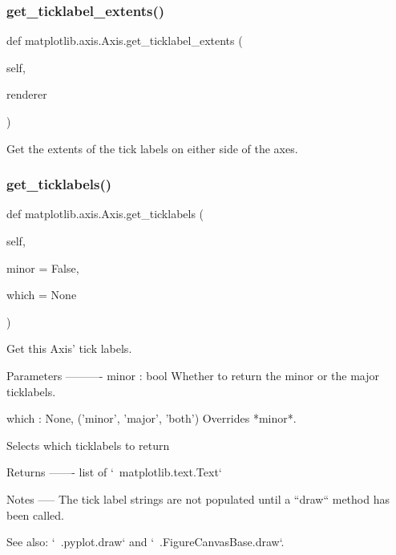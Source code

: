 \subsubsection{\texorpdfstring{get\+\_\+ticklabel\+\_\+extents()}{get\_ticklabel\_extents()}}
{\footnotesize\ttfamily def matplotlib.\+axis.\+Axis.\+get\+\_\+ticklabel\+\_\+extents (\begin{DoxyParamCaption}\item[{}]{self,  }\item[{}]{renderer }\end{DoxyParamCaption})}

\begin{DoxyVerb}Get the extents of the tick labels on either side
of the axes.
\end{DoxyVerb}
 \mbox{\label{classmatplotlib_1_1axis_1_1Axis_ae28c6fc8220dc16ef17eef94fd11fb4a}} 
\subsubsection{\texorpdfstring{get\+\_\+ticklabels()}{get\_ticklabels()}}
{\footnotesize\ttfamily def matplotlib.\+axis.\+Axis.\+get\+\_\+ticklabels (\begin{DoxyParamCaption}\item[{}]{self,  }\item[{}]{minor = {\ttfamily False},  }\item[{}]{which = {\ttfamily None} }\end{DoxyParamCaption})}

\begin{DoxyVerb}Get this Axis' tick labels.

Parameters
----------
minor : bool
   Whether to return the minor or the major ticklabels.

which : None, ('minor', 'major', 'both')
   Overrides *minor*.

   Selects which ticklabels to return

Returns
-------
list of `~matplotlib.text.Text`

Notes
-----
The tick label strings are not populated until a ``draw`` method has
been called.

See also: `~.pyplot.draw` and `~.FigureCanvasBase.draw`.
\end{DoxyVerb}
 \mbox{\label{classmatplotlib_1_1axis_1_1Axis_a0c7cf03356111b6d678cf47351910116}} 
